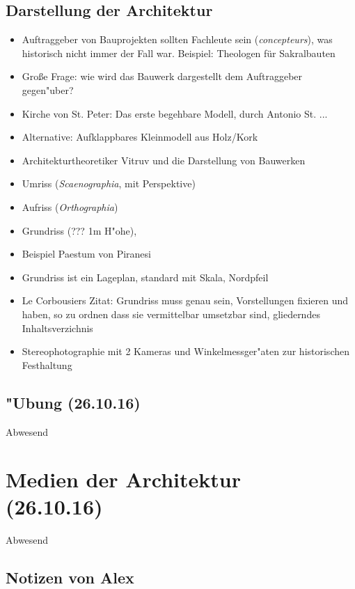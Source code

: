 \documentclass[]{scrartcl}
\begin{document}
\subsection{Darstellung der Architektur}

\begin{itemize}
    \item Auftraggeber von Bauprojekten sollten Fachleute sein (\emph{concepteurs}), was historisch nicht immer der Fall war. Beispiel: Theologen für Sakralbauten
    \item Gro\ss e Frage: wie wird das Bauwerk dargestellt dem Auftraggeber gegen"uber?
    \item Kirche von St. Peter: Das erste begehbare Modell, durch Antonio St. ... 
    \item Alternative: Aufklappbares Kleinmodell aus Holz/Kork
    \item Architekturtheoretiker Vitruv und die Darstellung von Bauwerken
    \item Umriss (\emph{Scaenographia}, mit Perspektive)
    \item Aufriss (\emph{Orthographia})
    \item Grundriss (??? 1m H"ohe),
    \item Beispiel Paestum von Piranesi
    \item Grundriss ist ein Lageplan, standard mit Skala, Nordpfeil
    \item Le Corbousiers Zitat: Grundriss muss genau sein, Vorstellungen fixieren und haben, so zu ordnen dass sie vermittelbar umsetzbar sind, gliederndes Inhaltsverzichnis
    \item Stereophotographie mit 2 Kameras und Winkelmessger"aten zur historischen Festhaltung 
\end{itemize}

\subsection{"Ubung  (26.10.16)}
Abwesend

\section{Medien der Architektur\\(26.10.16)}

Abwesend

\subsection{Notizen von Alex}
\end{document}
